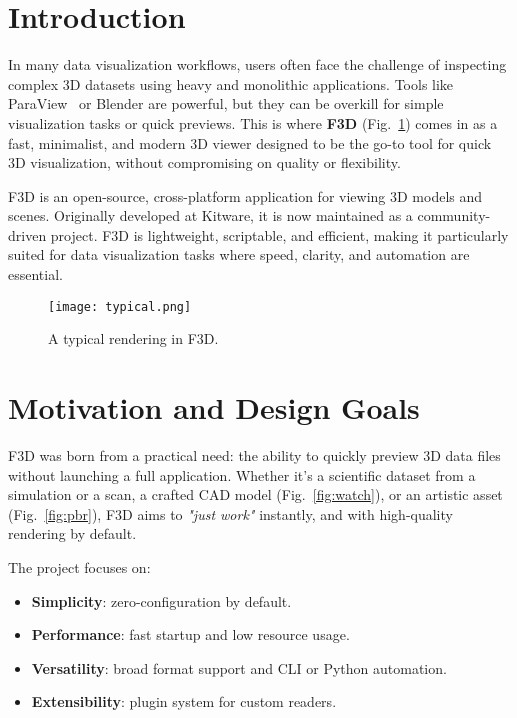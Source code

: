 \documentclass[10pt,journal,cspaper,compsoc]{journeevisu}
\author{ Michael Migliore
\IEEEcompsocitemizethanks{
\IEEEcompsocthanksitem Michael Migliore: f3d-app foundation
  \protect\\E-mail: contact@f3d.app
}
}
\begin{document}
\maketitle

\section{Introduction}

In many data visualization workflows, users often face the challenge of inspecting complex 3D datasets using heavy and monolithic applications. Tools like ParaView~\cite{ayachit2012paraview} or Blender are powerful, but they can be overkill for simple visualization tasks or quick previews. This is where \textbf{F3D} (Fig.~\ref{fig:typical}) comes in as a fast, minimalist, and modern 3D viewer designed to be the go-to tool for quick 3D visualization, without compromising on quality or flexibility.

F3D is an open-source, cross-platform application for viewing 3D models and scenes. Originally developed at Kitware, it is now maintained as a community-driven project. F3D is lightweight, scriptable, and efficient, making it particularly suited for data visualization tasks where speed, clarity, and automation are essential.

\begin{figure}[h]
  \centering
  \texttt{[image: typical.png]}
  \caption{A typical rendering in F3D.}
  \label{fig:typical}
\end{figure}

\section{Motivation and Design Goals}

F3D was born from a practical need: the ability to quickly preview 3D data files without launching a full application. Whether it's a scientific dataset from a simulation or a scan, a crafted CAD model (Fig.~\ref{fig:watch}), or an artistic asset (Fig.~\ref{fig:pbr}), F3D aims to \emph{"just work"} instantly, and with high-quality rendering by default.

The project focuses on:
\begin{itemize}
    \item \textbf{Simplicity}: zero-configuration by default.
    \item \textbf{Performance}: fast startup and low resource usage.
    \item \textbf{Versatility}: broad format support and CLI or Python automation.
    \item \textbf{Extensibility}: plugin system for custom readers.
\end{itemize}
\end{document}
